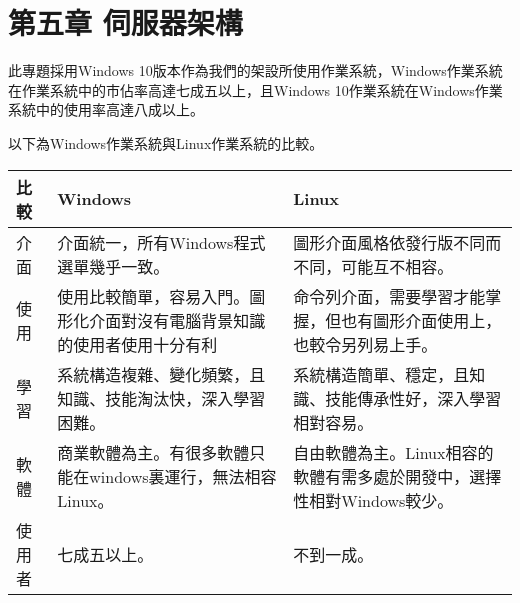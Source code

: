 \chapter{第五章 \quad 伺服器架構}
\renewcommand{\baselinestretch}{10} %
\par
\renewcommand{\baselinestretch}{1} %
\twelve \qquad 此專題採用Windows 10版本作為我們的架設所使用作業系統，Windows作業系統在作業系統中的市佔率高達七成五以上，且Windows 10作業系統在Windows作業系統中的使用率高達八成以上。
\\
\par
\renewcommand{\baselinestretch}{1} %
\twelve \hspace{0.5em} 以下為Windows作業系統與Linux作業系統的比較。
\par
\begin{center}
\begin{tabular}{|l|p{6.5cm}|p{6.5cm}|} %
\hline
比較&Windows&Linux 
\\
\hline
介面&介面統一，所有Windows程式選單幾乎一致。&圖形介面風格依發行版不同而不同，可能互不相容。
\\
\hline
使用&使用比較簡單，容易入門。圖形化介面對沒有電腦背景知識的使用者使用十分有利&命令列介面，需要學習才能掌握，但也有圖形介面使用上，也較令另列易上手。
\\
\hline
學習&系統構造複雜、變化頻繁，且知識、技能淘汰快，深入學習困難。&系統構造簡單、穩定，且知識、技能傳承性好，深入學習相對容易。
\\
\hline
軟體&商業軟體為主。有很多軟體只能在windows裏運行，無法相容Linux。&自由軟體為主。Linux相容的軟體有需多處於開發中，選擇性相對Windows較少。
\\
\hline
使用者&七成五以上。&不到一成。
\\
\hline
\end{tabular}
\end{center}
\par

\renewcommand{\baselinestretch}{20} %
